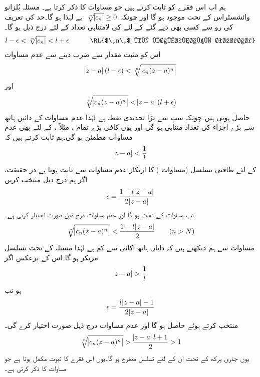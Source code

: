 ہم اب اس فقرے کو ثابت کرتے ہیں جو مساوات  کا ذکر کرتا ہے۔ مسئلہ بُلزانو وائشسٹراس  کے تحت  موجود ہو گا اور چونکہ
$\,\sqrt[\leftroot{-2}n]{\abs{c_n}}\ge 0\,$
ہے لہٰذا  ہو گا۔حد کی تعریف کی رو سے  کسی بھی دیے گئے  کے لئے  کی لامتناہی تعداد کے لئے درج ذیل ہو گا۔
\begin{align*}
l-\epsilon<\sqrt[\leftroot{-2}n]{\abs{c_n}}<l+\epsilon\quad \quad \quad \text{\RL{$\,n\,$ کی لامتناہی تعداد}}
\end{align*}
اس کو مثبت مقدار  سے ضرب دینے سے عدم مساوات
\begin{align}\label{مساوات_ٹیلر_رداس_ارتکاز_پ}
\abs{z-a}(l-\epsilon)<\sqrt[\leftroot{-2}n]{\abs{c_n(z-a)^n}}
\end{align}
اور
\begin{align}\label{مساوات_ٹیلر_رداس_ارتکاز_ت}
\sqrt[\leftroot{-2}n]{\abs{c_n(z-a)^n}}<\abs{z-a}(l+\epsilon)
\end{align}
حاصل ہوتی ہیں۔چونکہ  سب سے بڑا تحدیدی نقطہ ہے لہٰذا  عدم مساوات  کے دائیں ہاتھ سے بڑے اجزاء کی تعداد متناہی ہو گی اور یوں 
 کافی بڑے تمام ، مثلاً ، کے لئے بھی عدم مساوات  مطمئن ہو گی۔ہم ثابت کرتے ہیں کہ
\begin{align}\label{مساوات_ٹیلر_رداس_ارتکاز_ٹ}
\abs{z-a}<\frac{1}{l}
\end{align}
کے لئے طاقتی تسلسل (مساوات ) کا ارتکاز  عدم مساوات  سے ثابت ہوتا ہے۔در حقیقت، اگر ہم درج ذیل منتخب کریں
\begin{align*}
\epsilon=\frac{1-l\abs{z-a}}{2\abs{z-a}}
\end{align*}
تب مساوات  کے تحت  ہو گا اور عدم مساوات  درج ذیل صورت اختیار کرتی ہے۔
\begin{align*}
\sqrt[\leftroot{-2}n]{\abs{c_n(z-a)^n}}<\frac{1+l\abs{z-a}}{2}\quad \quad (n>N)
\end{align*}
مساوات  سے ہم دیکھتے ہیں کہ دایاں ہاتھ اکائی سے کم ہے لہٰذا مسئلہ  کے تحت تسلسل مرتکز ہو گا۔اس کے برعکس اگر 
\begin{align*}
\abs{z-a}>\frac{1}{l}
\end{align*}
ہو تب
\begin{align*}
\epsilon=\frac{l\abs{z-a}-1}{2\abs{z-a}}
\end{align*}
منتخب کرتے ہوئے  حاصل ہو گا اور  عدم مساوات  درج ذیل صورت اختیار کرے گی۔
\begin{align*}
\sqrt[\leftroot{-2}n]{\abs{c_n(z-a)^n}}>\frac{\abs{z-a}l+1}{2}>1
\end{align*}
یوں جذری پرکھ کے تحت ان  کے لئے تسلسل منفرج ہو گا۔یوں اس فقرے کا ثبوت مکمل ہوتا ہے  جو مساوات  کا ذکر کرتی ہے۔

